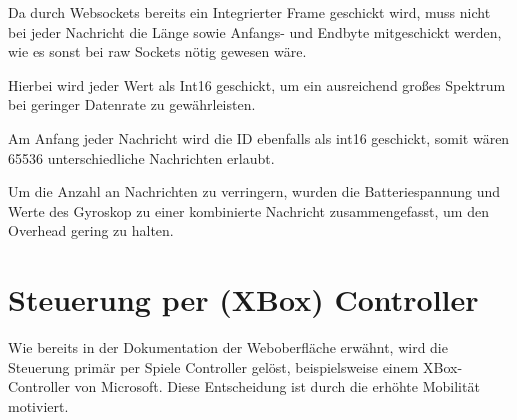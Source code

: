 Da durch Websockets bereits ein Integrierter Frame geschickt wird, muss nicht bei jeder Nachricht die Länge sowie Anfangs- und Endbyte mitgeschickt werden, wie es sonst bei raw Sockets nötig gewesen wäre.\par

Hierbei wird jeder Wert als Int16 geschickt, um ein ausreichend großes Spektrum bei geringer Datenrate zu gewährleisten. \par

Am Anfang jeder Nachricht wird die ID ebenfalls als int16 geschickt, somit wären 65536 unterschiedliche Nachrichten erlaubt.\par

Um die Anzahl an Nachrichten zu verringern, wurden die Batteriespannung und Werte des Gyroskop zu einer kombinierte Nachricht zusammengefasst, um den Overhead gering zu halten.\par

\begin{table}[ht]
	\centering
\caption{Binäres Protokoll} 
\label{table:protokoll}
\end{table} 



\section{Steuerung per (XBox) Controller}
Wie bereits in der Dokumentation der Weboberfläche erwähnt, wird die Steuerung primär per Spiele Controller gelöst, beispielsweise einem XBox-Controller von Microsoft.
Diese Entscheidung ist durch die erhöhte Mobilität motiviert. 

